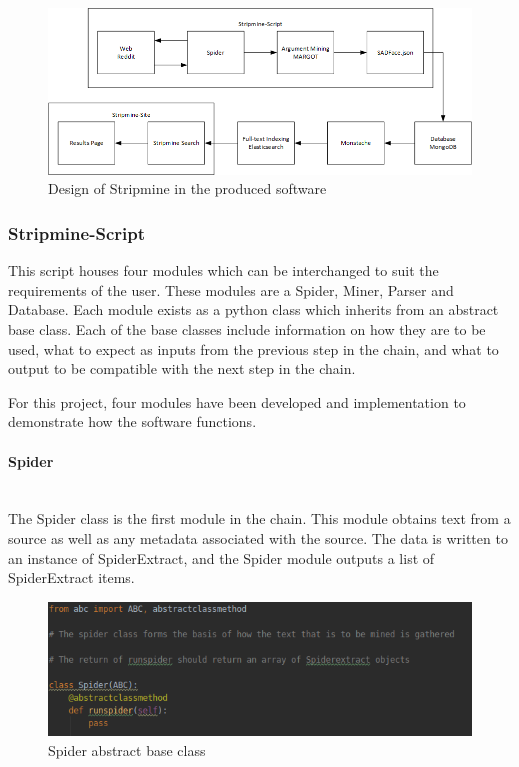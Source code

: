 \documentclass[12pt,a4paper]{article}
\begin{document}
\begin{figure}[H]
    \centering
    \includegraphics[scale=0.66]{Report/graphics/newdesign.png}
    \caption{Design of Stripmine in the produced software}
    \label{fig:newdesign}
\end{figure}

\subsubsection{Stripmine-Script}

This script houses four modules which can be interchanged to suit the requirements of the user. These modules are a Spider, Miner, Parser and Database. Each module exists as a python class which inherits from an abstract base class. Each of the base classes include information on how they are to be used, what to expect as inputs from the previous step in the chain, and what to output to be compatible with the next step in the chain. 

For this project, four modules have been developed and implementation to demonstrate how the software functions.

\paragraph{Spider}\mbox{}\\

The Spider class is the first module in the chain. This module obtains text from a source as well as any metadata associated with the source. The data is written to an instance of SpiderExtract, and the Spider module outputs a list of SpiderExtract items.

\begin{figure}[H]
    \centering
    \includegraphics[scale=0.6]{Report/graphics/ABC.png}
    \caption{Spider abstract base class}
    \label{fig:ABC}
\end{figure}
\end{document}
